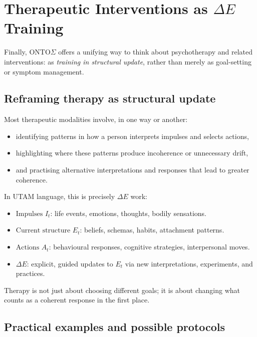 \documentclass[12pt,a4paper]{report}
\begin{document}
\section{Therapeutic Interventions as \texorpdfstring{$\Delta E$}{ΔE} Training}

Finally, ONTO$\Sigma$ offers a unifying way to think about psychotherapy and related interventions: as \emph{training in structural update}, rather than merely as goal-setting or symptom management.

\subsection*{Reframing therapy as structural update}

Most therapeutic modalities involve, in one way or another:

\begin{itemize}[leftmargin=2em]
    \item identifying patterns in how a person interprets impulses and selects actions,
    \item highlighting where these patterns produce incoherence or unnecessary drift,
    \item and practising alternative interpretations and responses that lead to greater coherence.
\end{itemize}

In UTAM language, this is precisely $\Delta E$ work:

\begin{itemize}[leftmargin=2em]
    \item \(\text{Impulses } I_t\): life events, emotions, thoughts, bodily sensations.
    \item \(\text{Current structure } E_t\): beliefs, schemas, habits, attachment patterns.
    \item \(\text{Actions } A_t\): behavioural responses, cognitive strategies, interpersonal moves.
    \item \(\Delta E\): explicit, guided updates to \(E_t\) via new interpretations, experiments, and practices.
\end{itemize}

Therapy is not just about choosing different goals; it is about changing what counts as a coherent response in the first place.

\subsection*{Practical examples and possible protocols}
\end{document}
